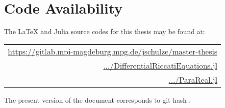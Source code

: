 \section*{Code Availability}

The \LaTeX{} and Julia source codes for this thesis may be found at:
\begin{center}
\begin{tabular}{r}
  \url{https://gitlab.mpi-magdeburg.mpg.de/jschulze/master-thesis} \\
  \href{https://gitlab.mpi-magdeburg.mpg.de/jschulze/DifferentialRiccatiEquations.jl}{\ttfamily .../DifferentialRiccatiEquations.jl} \\
  \href{https://gitlab.mpi-magdeburg.mpg.de/jschulze/ParaReal.jl}{\ttfamily .../ParaReal.jl}
\end{tabular}
\end{center}
The present version of the document corresponds to git hash
\code{}\unskip.
